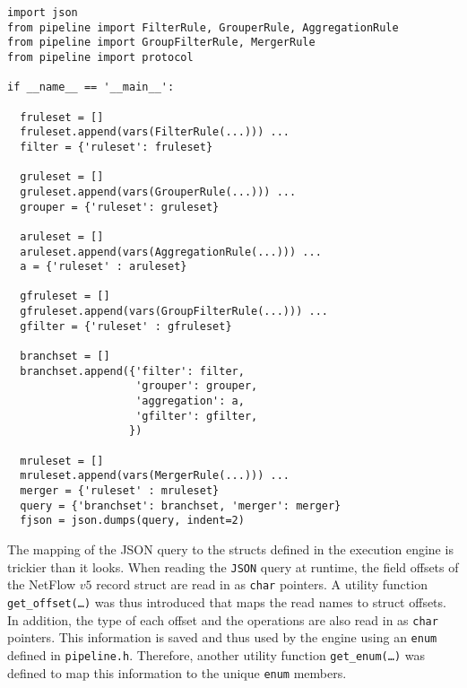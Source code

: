 \begin{lstlisting}
import json
from pipeline import FilterRule, GrouperRule, AggregationRule
from pipeline import GroupFilterRule, MergerRule
from pipeline import protocol

if __name__ == '__main__':

  fruleset = []
  fruleset.append(vars(FilterRule(...))) ...
  filter = {'ruleset': fruleset}

  gruleset = []
  gruleset.append(vars(GrouperRule(...))) ...
  grouper = {'ruleset': gruleset}

  aruleset = []
  aruleset.append(vars(AggregationRule(...))) ...
  a = {'ruleset' : aruleset}

  gfruleset = []
  gfruleset.append(vars(GroupFilterRule(...))) ...
  gfilter = {'ruleset' : gfruleset}

  branchset = []
  branchset.append({'filter': filter,
                    'grouper': grouper,
                    'aggregation': a,
                    'gfilter': gfilter,
                   })

  mruleset = []
  mruleset.append(vars(MergerRule(...))) ...
  merger = {'ruleset' : mruleset}
  query = {'branchset': branchset, 'merger': merger}
  fjson = json.dumps(query, indent=2)
\end{lstlisting}






The mapping of the JSON query to the structs defined in the execution engine
is trickier than it looks. When reading the \texttt{JSON} query at runtime,
the field offsets of the NetFlow $v5$ record struct are read in as
\texttt{char} pointers. A utility function \texttt{get\_offset(\ldots)} was
thus  introduced that maps the read names
to struct offsets. In addition, the type of each offset and the operations are
also read in as \texttt{char} pointers. This information is saved and thus
used by the engine using an \texttt{enum} defined in \texttt{pipeline.h}.
Therefore, another utility function \texttt{get\_enum(\ldots)} was defined to
map this information to the unique \texttt{enum} members.


